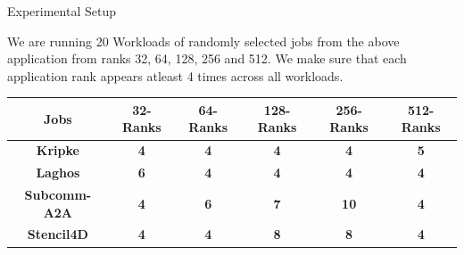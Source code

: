 \documentclass[final]{beamer}
\newlength{\onecolwid}
\newlength{\twocolwid}
\begin{document}
\begin{frame}[t]
\begin{columns}[t]
\begin{column}{\twocolwid} %

\begin{columns}[t,totalwidth=\twocolwid] %

\begin{column}{\onecolwid}\vspace{-.6in} %
\vspace{-1em}

\begin{block}{Experimental Setup}

We are running 20 Workloads of randomly selected jobs from the above application from ranks 32, 64, 128, 256 and 512. We make sure that each application rank appears atleast 4 times across all workloads. 
\begin{table}
\begin{adjustbox}{width=\columnwidth,height=0.3\columnwidth,left,valign=m}

\begin{tabular}{|c|c|c|c|c|c|} \hline
\textbf{Jobs} & \textbf{32-Ranks} & \textbf{64-Ranks} & \textbf{128-Ranks}  & \textbf{256-Ranks} & \textbf{512-Ranks}\\ \hline
\cellcolor{ProcessBlue!10}\textbf{Kripke} & \cellcolor{ProcessBlue!10}\textbf{4} & \cellcolor{ProcessBlue!10}\textbf{4} & \cellcolor{ProcessBlue!10}\textbf{4} & \cellcolor{ProcessBlue!10}\textbf{4} & \cellcolor{ProcessBlue!10}\textbf{5}  \\ \hline

\textbf{Laghos} & \textbf{6} & \textbf{4} & \textbf{4} & \textbf{4} & \textbf{4}  \\ \hline

\cellcolor{ProcessBlue!10}\textbf{Subcomm-A2A} & \cellcolor{ProcessBlue!10}\textbf{4} & \cellcolor{ProcessBlue!10}\textbf{6} & \cellcolor{ProcessBlue!10}\textbf{7} & \cellcolor{ProcessBlue!10}\textbf{10} & \cellcolor{ProcessBlue!10}\textbf{4}  \\ \hline

\textbf{Stencil4D} & \textbf{4} & \textbf{4} & \textbf{8} & \textbf{8} & \textbf{4}  \\ \hline


\end{tabular}
\end{adjustbox}
\end{table}
\end{block}
\end{column}
\end{columns}
\end{column}
\end{columns}
\end{frame}
\end{document}
